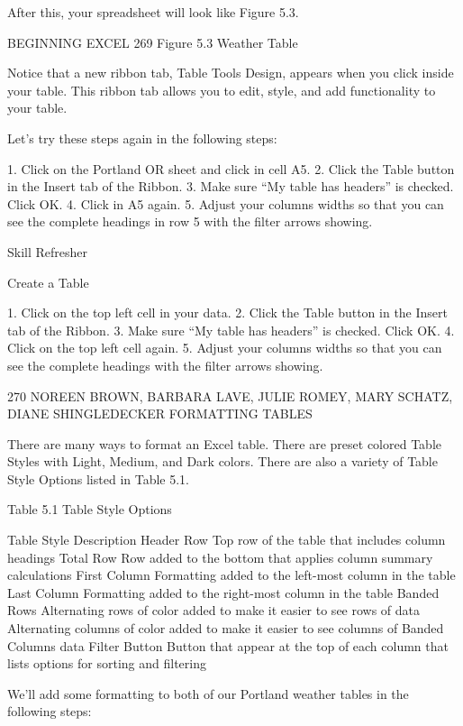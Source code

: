 After this, your spreadsheet will look like Figure 5.3.




BEGINNING EXCEL 269
Figure 5.3 Weather Table


Notice that a new ribbon tab, Table Tools Design, appears when you click inside your table. This
ribbon tab allows you to edit, style, and add functionality to your table.

Let’s try these steps again in the following steps:

1.    Click on the Portland OR sheet and click in cell A5.
2.    Click the Table button in the Insert tab of the Ribbon.
3.    Make sure “My table has headers” is checked. Click OK.
4.    Click in A5 again.
5.    Adjust your columns widths so that you can see the complete headings in row 5 with the filter
arrows showing.




Skill Refresher


Create a Table

1. Click on the top left cell in your data.
2. Click the Table button in the Insert tab of the Ribbon.
3. Make sure “My table has headers” is checked. Click OK.
4. Click on the top left cell again.
5. Adjust your columns widths so that you can see the complete headings with the filter arrows showing.


270 NOREEN BROWN, BARBARA LAVE, JULIE ROMEY, MARY SCHATZ, DIANE SHINGLEDECKER
FORMATTING TABLES

There are many ways to format an Excel table. There are preset colored Table Styles with Light,
Medium, and Dark colors. There are also a variety of Table Style Options listed in Table 5.1.

Table 5.1 Table Style Options

Table Style          Description
Header Row           Top row of the table that includes column headings
Total Row            Row added to the bottom that applies column summary calculations
First Column         Formatting added to the left-most column in the table
Last Column          Formatting added to the right-most column in the table
Banded Rows          Alternating rows of color added to make it easier to see rows of data
Alternating columns of color added to make it easier to see columns of
Banded Columns
data
Filter Button        Button that appear at the top of each column that lists options for sorting and filtering


We’ll add some formatting to both of our Portland weather tables in the following steps:

